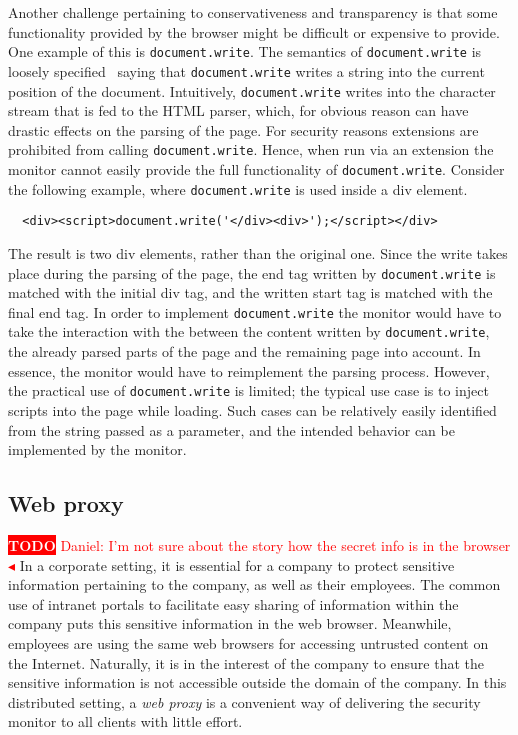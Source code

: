 \documentclass{llncs}
\newcommand{\todo}[1]{\colorbox{red}{\textcolor{white}{\sffamily\bfseries\scriptsize TODO}} \textcolor{red}{#1} \textcolor{red}{$\blacktriangleleft$}}
\begin{document}
Another challenge pertaining to conservativeness and transparency is that some
functionality provided by the browser might be difficult or expensive to
provide.  One example of this is \lstinline{document.write}. The semantics of
\lstinline{document.write} is loosely specified~\cite{DOM:LVL2} saying that
\lstinline{document.write} writes a string into the current position of the
document.  Intuitively, \lstinline{document.write} writes into the character
stream that is fed to the HTML parser, which, for obvious reason can have
drastic effects on the parsing of the page. For security reasons extensions are
prohibited from calling \lstinline{document.write}. Hence, when run via an
extension the monitor cannot easily provide the full functionality of
\lstinline{document.write}.  Consider the following example, where
\lstinline{document.write} is used inside a div element.

\begin{verbatim}
  <div><script>document.write('</div><div>');</script></div>
\end{verbatim}

The result is two div elements, rather than the original one. Since the write
takes place during the parsing of the page, the end tag written by
\lstinline{document.write} is matched with the initial div tag, and the written
start tag is matched with the final end tag. In order to implement
\lstinline{document.write} the monitor would have to take the interaction with the
between the content written by \lstinline{document.write}, the already parsed parts
of the page and the remaining page into account. In essence, the monitor would
have to reimplement the parsing process.  However, the practical use of
\lstinline{document.write} is limited; the typical use case is to inject scripts
into the page while loading. Such cases can be relatively easily identified
from the string passed as a parameter, and the intended behavior can be
implemented by the monitor.




\subsection{Web proxy}

\todo{Daniel: I'm not sure about the story how the secret info is in the browser}
In a corporate setting, it is essential for a company to protect 
sensitive information pertaining to the company, as well as their employees. 
The common use of intranet portals to facilitate easy sharing of information 
within the company puts this sensitive information in the web browser. 
Meanwhile, employees are using the same web browsers for accessing untrusted content on 
the Internet. Naturally, it is in the interest of the company to ensure that 
the sensitive information is not accessible outside the domain of the company.
In this distributed setting, a \emph{web proxy} is a convenient way of delivering 
the security monitor to all clients with little effort. 
\end{document}
